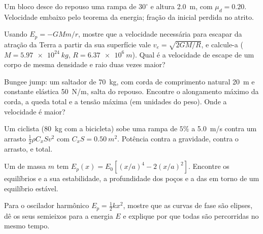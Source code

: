 \begin{exercise}[$\star\star$]\label{exo:b1:work-and-energy:5}
Um bloco desce do repouso uma rampa de $30^\circ$ e altura \qty{2.0}{m},
com $\mu_d = 0.20$. Velocidade embaixo pelo teorema da energia; fração
da  inicial perdida no atrito.
\end{exercise}

\begin{exercise}[$\star\star$]\label{exo:b1:work-and-energy:6}
Usando $E_p = -GMm/r$, mostre que a velocidade necessária para escapar da atração
da Terra a partir da sua superfície vale $v_e = \sqrt{2GM/R}$, e calcule-a
($M = \qty{5.97e24}{kg}$, $R = \qty{6.37e6}{m}$). Qual é a velocidade de
escape de um corpo de mesma densidade e raio duas vezes maior?
\end{exercise}

\begin{exercise}[$\star\star$]\label{exo:b1:work-and-energy:7}
Bungee jump: um saltador de \qty{70}{kg}, com corda de comprimento natural \qty{20}{m} e
constante elástica \qty{50}{N/m}, salta do repouso. Encontre o alongamento máximo da
corda, a queda total e a tensão máxima (em unidades do
peso). Onde a velocidade é maior?
\end{exercise}

\begin{exercise}[$\star\star$]\label{exo:b1:work-and-energy:8}
Um ciclista (\qty{80}{kg} com a bicicleta) sobe uma rampa de $5\%$ a \qty{5.0}{m/s}
contra um arrasto $\tfrac12\rho C_xSv^2$ com $C_xS = \qty{0.50}{m^2}$.
Potência contra a gravidade, contra o arrasto, e total.
\end{exercise}

\begin{exercise}[$\star\star$]\label{exo:b1:work-and-energy:9}
Um  de massa $m$ tem $E_p(x) = E_0[(x/a)^4 - 2(x/a)^2]$. Encontre os
equilíbrios e a sua estabilidade, a profundidade dos poços e a  das  em torno de um equilíbrio estável.
\end{exercise}

\begin{exercise}[$\star\star\star$]\label{exo:b1:work-and-energy:10}
Para o oscilador harmônico $E_p = \tfrac12 kx^2$, mostre que as curvas de
fase são elipses, dê os seus semieixos para a energia $E$ e explique
por que todas são percorridas no mesmo tempo.
\end{exercise}

